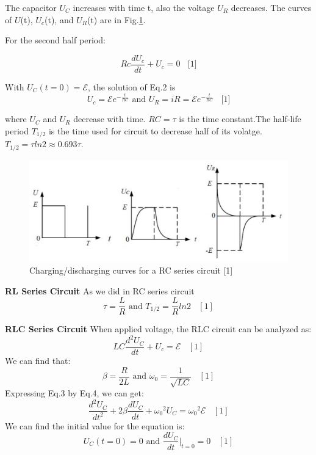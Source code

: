 \documentclass[12pt,a4paper]{article}
\begin{document}
The capacitor $U_C$ increases with time t, also the voltage $U_R$ decreases. The curves of $U$(t), $U_c$(t), and $U_R$(t) are in Fig.\ref{rcfig}.

For the second half period:

\begin{equation}
    Rc\frac{dU_c}{dt}+U_c=0~~~~\text{[1]}
\end{equation}

With $U_C(t = 0) = \mathcal{E}$, the solution of Eq.2 is
$$U_c=\mathcal{E}e^{-\frac{t}{RC}}\text{ and }U_R=iR=\mathcal{E}e^{-\frac{t}{RC}}~~~~\text{[1]}$$

where $U_C$ and $U_R$ decrease with time. $RC=\tau$ is the time constant.The half-life period $T_{1/2}$ is the time used for circuit to decrease half of its volatge.
$T_{1/2} = \tau ln 2 \approx 0.693 \tau$.


\begin{figure}[H]
    \centering
    \includegraphics[width=14cm]{rcfig.png}
    \caption{Charging/discharging curves for a RC series circuit    [1]}
    \label{rcfig}
\end{figure}

\textbf{\qquad RL Series Circuit}
As we did in RC series circuit
$$\tau=\frac{L}{R}\text{ and }T_{1/2}=\frac{L}{R}ln 2~~~~[1]$$

\textbf{\qquad RLC Series Circuit}
When applied voltage, the RLC circuit can be analyzed as:
\begin{equation}
    LC\frac{d^2U_C}{dt}+U_c=\mathcal{E}~~~~[1]
\end{equation}
We can find that:
\begin{equation}
    \beta=\frac{R}{2L}\text{ and }\omega_0=\frac{1}{\sqrt{LC}}~~~~[1]
\end{equation}
Expressing Eq.3 by Eq.4, we can get:
\begin{equation}
    \frac{d^2U_C}{dt^2}+2\beta\frac{dU_C}{dt}+{\omega_0}^2U_C={\omega_0}^2\mathcal{E}~~~~[1]
\end{equation}
We can find the initial value for the equation is:
\begin{equation}
    U_C(t=0)=0\text{ and }\frac{dU_C}{dt}|_{t=0}=0~~~~[1]
\end{equation}
\end{document}
